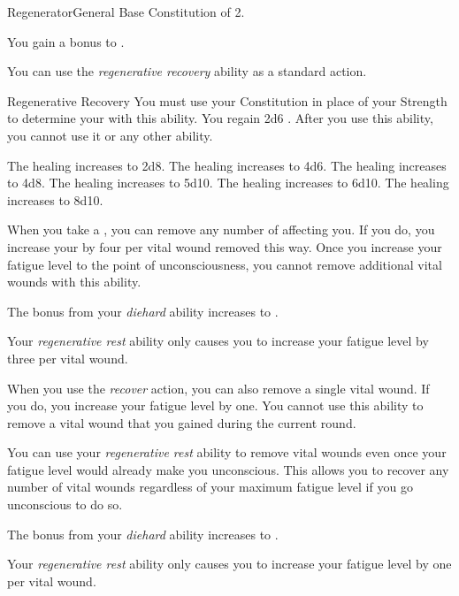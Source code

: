     \begin{feat}{Regenerator}{General}
        \featpre Base Constitution of 2.

         You gain a  bonus to .

         You can use the \textit{regenerative recovery} ability as a standard action.
        \begin{instantability}{Regenerative Recovery}
            \rankline
            You must use your Constitution in place of your Strength to determine your  with this ability.
            You regain 2d6 \add {} .
            After you use this ability, you  cannot use it or any other  ability.

            \rankline
             The healing increases to 2d8.
             The healing increases to 4d6.
             The healing increases to 4d8.
             The healing increases to 5d10.
             The healing increases to 6d10.
             The healing increases to 8d10.
        \end{instantability}

         When you take a , you can remove any number of  affecting you.
        If you do, you increase your  by four per vital wound removed this way.
        Once you increase your fatigue level to the point of unconsciousness, you cannot remove additional vital wounds with this ability.

         The bonus from your \textit{diehard} ability increases to .

         Your \textit{regenerative rest} ability only causes you to increase your fatigue level by three per vital wound.

         When you use the \textit{recover} action, you can also remove a single vital wound.
        If you do, you increase your fatigue level by one.
        You cannot use this ability to remove a vital wound that you gained during the current round.

         You can use your \textit{regenerative rest} ability to remove vital wounds even once your fatigue level would already make you unconscious.
        This allows you to recover any number of vital wounds regardless of your maximum fatigue level if you go unconscious to do so.

         The bonus from your \textit{diehard} ability increases to .

         Your \textit{regenerative rest} ability only causes you to increase your fatigue level by one per vital wound.
    \end{feat}

